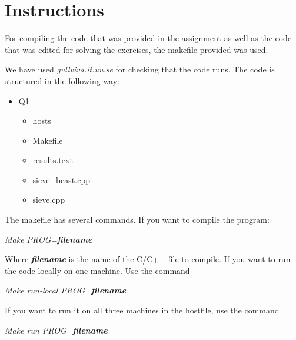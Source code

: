 \section{Instructions}

For compiling the code that was provided in the assignment as well as the 
code that was edited for solving the exercises, the makefile provided was used.

We have used \textit{gullviva.it.uu.se} for checking that the code runs.
The code is structured in the following way:

\begin{itemize}
    \item Q1
    \begin{itemize}
        \item hosts
        \item Makefile
        \item results.text
        \item sieve\_bcast.cpp
        \item sieve.cpp
    \end{itemize}
\end{itemize}

The makefile has several commands. If you want to compile the program:

\begin{center}
    \textit{Make PROG=\textbf{filename}}
\end{center}

Where \textit{\textbf{filename}} is the name of the C/C++ file to compile. If 
you want to run the code locally on one machine. Use the command

\begin{center}
    \textit{Make run-local PROG=\textbf{filename}}
\end{center}

If you want to run it on all three machines in the hostfile, use the command

\begin{center}
    \textit{Make run PROG=\textbf{filename}}
\end{center}